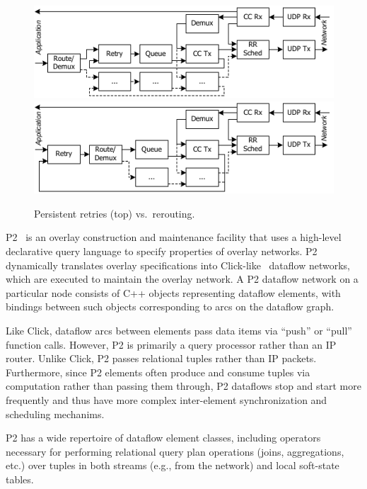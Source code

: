 
\begin{figure}
\center
\includegraphics{figures/ManyRetries}
\includegraphics{figures/SingleRetry}
\caption{Persistent retries (top) vs.\ rerouting.}
\label{fig:RetryOrdering}
\end{figure}

P2~\cite{p2:sosp} is an overlay construction and
maintenance facility that uses a high-level declarative query language
to specify properties of overlay networks.   P2 dynamically translates
overlay specifications into Click-like~\cite{click-tocs} dataflow
networks, which are executed to maintain the overlay network.  A P2
dataflow network on a particular node consists of C++ objects
representing dataflow elements, with bindings between such objects
corresponding to arcs on the dataflow graph.  

Like Click, dataflow arcs between
elements pass data items via ``push'' or ``pull'' function calls.
However, P2 is primarily a query processor rather than an IP router. 
Unlike Click, P2 passes relational tuples rather than IP packets.
Furthermore, since P2 elements often produce and consume tuples via
computation rather than passing them through, P2 dataflows stop and
start more frequently and thus have more complex inter-element
synchronization and scheduling mechanims. 

P2 has a wide repertoire of dataflow element classes, including
operators necessary for performing relational query plan operations
(joins, aggregations, etc.) over tuples in both streams (e.g., from
the network) and local soft-state tables. 

